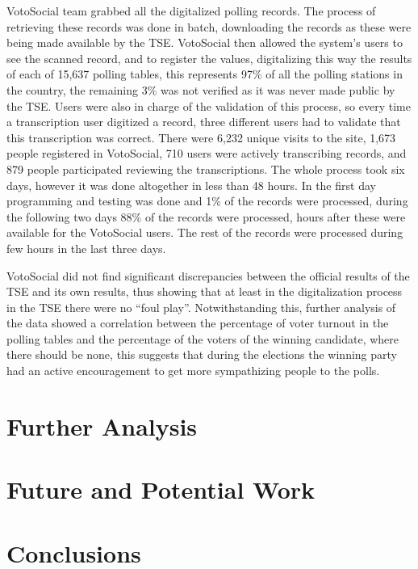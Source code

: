 \documentclass[a4paper,10pt]{article}
\begin{document}
VotoSocial team grabbed all the digitalized polling records. The process of retrieving these records was done in batch, downloading the records as these were being made available by the TSE. VotoSocial then allowed the system's users to see the scanned record, and to register the values, digitalizing this way the results of each of 15,637 polling tables, this represents 97\% of all the polling stations in the country, the remaining 3\% was not verified as it was never made public by the TSE. Users were also in charge of the validation of this process, so every time a transcription user digitized a record, three different users had to validate that this transcription was correct. There were 6,232 unique visits to the site, 1,673 people registered in VotoSocial, 710 users were actively transcribing records, and 879 people participated reviewing the transcriptions. The whole process took six days, however it was done altogether in less than 48 hours. In the first day programming and testing was done and 1\% of the records were processed, during the following two days 88\% of the records were processed, hours after these were available for the VotoSocial users. The rest of the records were processed during few hours in the last three days.

VotoSocial did not find significant discrepancies between the official results of the TSE and its own results, thus showing that at least in the digitalization process in the TSE there were no “foul play”. Notwithstanding this, further analysis of the data showed a correlation between the percentage of voter turnout in the polling tables and the percentage of the voters of the winning candidate, where there should be none, this suggests that during the elections the winning party had an active encouragement to get more sympathizing people to the polls.



\section{Further Analysis}

\section{Future and Potential Work}

\section{Conclusions}


\newpage




\end{document}
